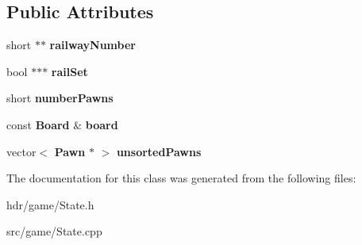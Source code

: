 \subsection*{Public Attributes}
\begin{DoxyCompactItemize}
\item 
short $\ast$$\ast$ {\bfseries railway\-Number}\label{class_state_aa894bfd06fe70d41f14527401d752bd6}

\item 
bool $\ast$$\ast$$\ast$ {\bfseries rail\-Set}\label{class_state_a06eec6ac8f191d3b7e6bfc85426e37c6}

\item 
short {\bfseries number\-Pawns}\label{class_state_a2bd881ff696f2807e54a4cc0b522f624}

\item 
const {\bf Board} \& {\bfseries board}\label{class_state_a74702298b35b8a798e85212bccff6daa}

\item 
vector$<$ {\bf Pawn} $\ast$ $>$ {\bfseries unsorted\-Pawns}\label{class_state_a7da42bb202d9bb967db82e1b8c65070e}

\end{DoxyCompactItemize}


The documentation for this class was generated from the following files\-:\begin{DoxyCompactItemize}
\item 
hdr/game/State.\-h\item 
src/game/State.\-cpp\end{DoxyCompactItemize}

